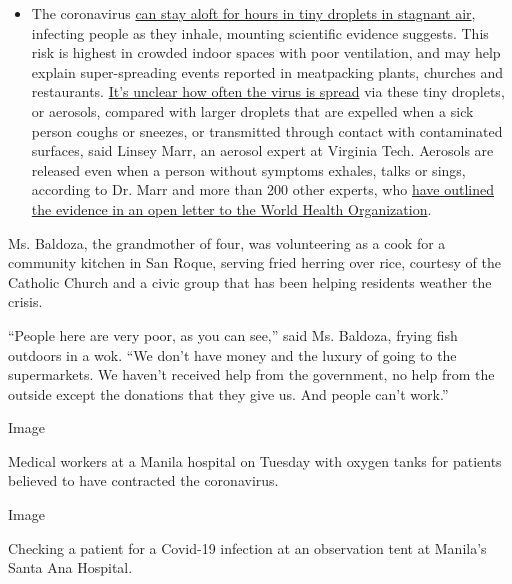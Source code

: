 \begin{itemize}
  \begin{itemize}
  \tightlist
  \item
    The coronavirus
    \href{https://www.nytimes3xbfgragh.onion/2020/07/04/health/239-experts-with-one-big-claim-the-coronavirus-is-airborne.html?action=click\&pgtype=Article\&state=default\&region=MAIN_CONTENT_3\&context=storylines_faq}{can
    stay aloft for hours in tiny droplets in stagnant air}, infecting
    people as they inhale, mounting scientific evidence suggests. This
    risk is highest in crowded indoor spaces with poor ventilation, and
    may help explain super-spreading events reported in meatpacking
    plants, churches and restaurants.
    \href{https://www.nytimes3xbfgragh.onion/2020/07/06/health/coronavirus-airborne-aerosols.html?action=click\&pgtype=Article\&state=default\&region=MAIN_CONTENT_3\&context=storylines_faq}{It's
    unclear how often the virus is spread} via these tiny droplets, or
    aerosols, compared with larger droplets that are expelled when a
    sick person coughs or sneezes, or transmitted through contact with
    contaminated surfaces, said Linsey Marr, an aerosol expert at
    Virginia Tech. Aerosols are released even when a person without
    symptoms exhales, talks or sings, according to Dr. Marr and more
    than 200 other experts, who
    \href{https://academic.oup.com/cid/article/doi/10.1093/cid/ciaa939/5867798}{have
    outlined the evidence in an open letter to the World Health
    Organization}.
  \end{itemize}
\end{itemize}

Ms. Baldoza, the grandmother of four, was volunteering as a cook for a
community kitchen in San Roque, serving fried herring over rice,
courtesy of the Catholic Church and a civic group that has been helping
residents weather the crisis.

``People here are very poor, as you can see,'' said Ms. Baldoza, frying
fish outdoors in a wok. ``We don't have money and the luxury of going to
the supermarkets. We haven't received help from the government, no help
from the outside except the donations that they give us. And people
can't work.''

Image

Medical workers at a Manila hospital on Tuesday with oxygen tanks for
patients believed to have contracted the coronavirus.

Image

Checking a patient for a Covid-19 infection at an observation tent at
Manila's Santa Ana Hospital.

